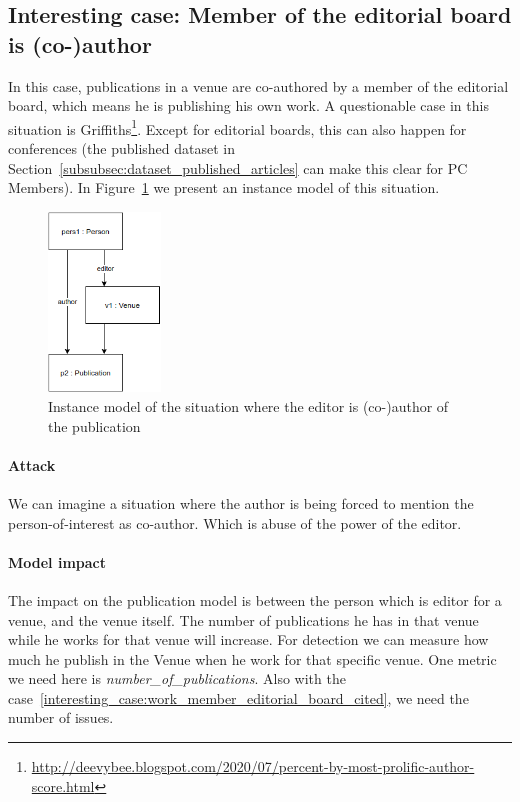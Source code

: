 \documentclass{ou-report}
\begin{document}
\subsection{Interesting case: Member of the editorial board is (co-)author}
\label{interesting_case:member_editorial_board_is_coauthor}
In this case, publications in a venue are co-authored by a member of the 
editorial board, which means he is publishing his own work. A questionable 
case in this situation is
Griffiths\footnote{\url{http://deevybee.blogspot.com/2020/07/percent-by-most-prolific-author-score.html}}.
Except for editorial boards, this can also happen for conferences (the published 
dataset in Section~\ref{subsubsec:dataset_published_articles} can make this 
clear for PC Members).
In Figure~\ref{fig:eia} we present an instance model of this situation.
\begin{figure}[H]
\centering
\includegraphics[width=3cm]{images/editor_is_author.drawio.png}
\caption{Instance model of the situation where the editor is (co-)author of 
the publication}
\label{fig:eia}
\end{figure}


\paragraph{Attack}
We can imagine a situation where the author is being forced to mention the 
person-of-interest as co-author. Which is abuse of the power of the editor.

\paragraph{Model impact}
The impact on the publication model is between the person which is editor for a 
venue, and the venue itself. 
The number of publications he has in that venue while he works for that venue 
will increase. For detection we can measure how much he publish in the Venue 
when he work for that specific venue.
One metric we need here is \textit{number\_of\_publications}. Also with the 
case~\ref{interesting_case:work_member_editorial_board_cited}, we need the 
number of issues.
\end{document}
